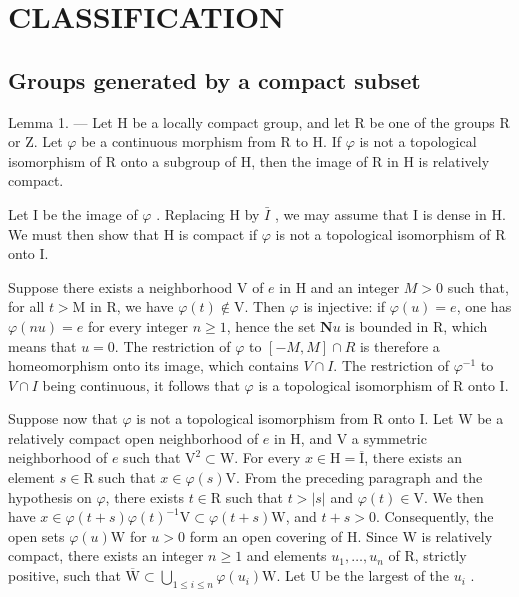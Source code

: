 \section{CLASSIFICATION}

\subsection{Groups generated by a compact subset}

Lemma 1. --- Let H be a locally compact group, and let R be one of the groups R or Z. Let \(\varphi\) be a continuous morphism from R to H. If \(\varphi\) is not a topological isomorphism of R onto a subgroup of H, then the image of R in H is relatively compact.

Let I be the image of \(\varphi\) . Replacing H by \(\bar{I}\) , we may assume that I is dense in H. We must then show that H is compact if \(\varphi\) is not a topological isomorphism of R onto I.

Suppose there exists a neighborhood V of \(e\) in H and an integer \(M > 0\) such that, for all \(t > \mathrm{M}\) in R, we have \(\varphi(t) \notin \mathrm{V}\). Then \(\varphi\) is injective: if \(\varphi(u) = e\), one has \(\varphi(nu) = e\) for every integer \(n \geqslant 1\), hence the set \(\mathbf{N}u\) is bounded in R, which means that \(u = 0\). The restriction of \(\varphi\) to \([-M, M] \cap R\) is therefore a homeomorphism onto its image, which contains \(V \cap I\). The restriction of \(\varphi^{-1}\) to \(V \cap I\) being continuous, it follows that \(\varphi\) is a topological isomorphism of R onto I.

Suppose now that \(\varphi\) is not a topological isomorphism from R onto I. Let W be a relatively compact open neighborhood of \(e\) in H, and V a symmetric neighborhood of \(e\) such that \(\mathrm{V}^2 \subset \mathrm{W}\). For every \(x \in \mathrm{H} = \overline{\mathrm{I}}\), there exists an element \(s \in \mathrm{R}\) such that \(x \in \varphi(s)\mathrm{V}\). From the preceding paragraph and the hypothesis on \(\varphi\), there exists \(t \in \mathrm{R}\) such that \(t > |s|\) and \(\varphi(t) \in \mathrm{V}\). We then have \(x \in \varphi(t + s)\varphi(t)^{-1}\mathrm{V} \subset \varphi(t + s)\mathrm{W}\), and \(t + s > 0\). Consequently, the open sets \(\varphi(u)\mathrm{W}\) for \(u > 0\) form an open covering of H. Since W is relatively compact, there exists an integer \(n \geqslant 1\) and elements \(u_1, \ldots, u_n\) of R, strictly positive, such that \(\overline{\mathrm{W}} \subset \bigcup_{1 \leqslant i \leqslant n} \varphi(u_i)\mathrm{W}\). Let U be the largest of the \(u_i\) .

